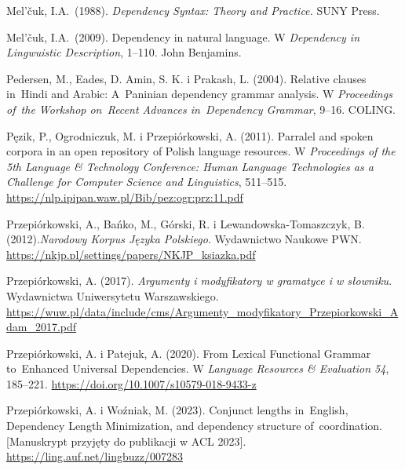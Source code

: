 \documentclass[licencjacka]{pracamgr_Kogni}
\begin{document}
\begin{thebibliography}{99}
        Mel'čuk, I.A.\ (1988). \textit{Dependency Syntax: Theory and Practice.} SUNY Press.

        Mel'čuk, I.A.\ (2009).
        Dependency in natural language.
        W \textit{Dependency in Lingwuistic Description}, 1--110.
        John Benjamins.

        Pedersen, M., Eades, D. Amin, S. K. i Prakash, L. (2004).
        Relative clauses in~Hindi and Arabic: A~Paninian dependency grammar analysis.
        W \textit{Proceedings of~the Workshop on~Recent Advances in~Dependency Grammar}, 9–16.
        COLING\@.

        Pęzik, P., Ogrodniczuk, M. i Przepiórkowski, A. (2011).
        Parralel and spoken corpora in an open repository of Polish language resources.
        W \textit{Proceedings of the 5th Language \& Technology Conference: Human Language Technologies as a Challenge for Computer Science and Linguistics}, 511--515. \url{https://nlp.ipipan.waw.pl/Bib/pez:ogr:prz:11.pdf}

        Przepiórkowski, A., Bańko, M., Górski, R. i Lewandowska-Tomaszczyk, B. (2012).\textit{Narodowy Korpus Języka Polskiego}.
        Wydawnictwo Naukowe PWN. \url{https://nkjp.pl/settings/papers/NKJP_ksiazka.pdf}

        Przepiórkowski, A. (2017). \textit{Argumenty i modyfikatory w gramatyce i w słowniku}.
        Wydawnictwa Uniwersytetu Warszawskiego. \url{https://wuw.pl/data/include/cms/Argumenty_modyfikatory_Przepiorkowski_Adam_2017.pdf}

        Przepiórkowski, A. i Patejuk, A. (2020).
        From Lexical Functional Grammar to~Enhanced Universal Dependencies.
        W \textit{Language Resources \& Evaluation 54}, 185–221. \url{https://doi.org/10.1007/s10579-018-9433-z}

        Przepiórkowski, A. i Woźniak, M. (2023).
        Conjunct lengths in~English, Dependency Length Minimization, and dependency structure of~coordination.
        [Manuskrypt przyjęty do publikacji w ACL 2023]. \url{https://ling.auf.net/lingbuzz/007283}


\end{thebibliography}
\end{document}
